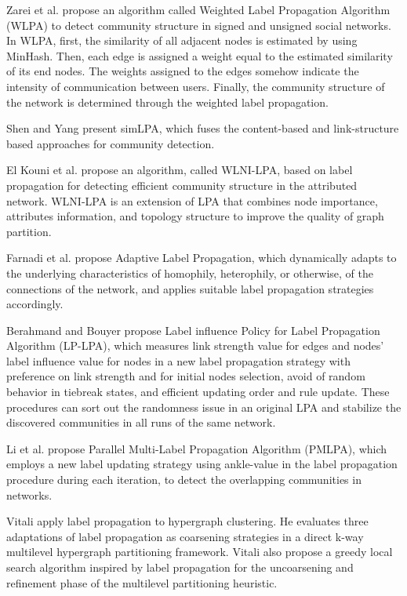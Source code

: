 {Zarei et al. \cite{zarei2020detecting} propose an algorithm called Weighted Label Propagation Algorithm (WLPA) to detect community structure in signed and unsigned social networks. In WLPA, first, the similarity of all adjacent nodes is estimated by using MinHash. Then, each edge is assigned a
weight equal to the estimated similarity of its end nodes. The weights assigned to the edges somehow indicate the intensity of communication
between users. Finally, the community structure of the network is determined through the weighted label propagation.

Shen and Yang \cite{shen2016topic} present simLPA, which fuses the content-based and link-structure based approaches for community detection.

El Kouni et al. \cite{el2021wlni} propose an algorithm, called WLNI-LPA, based on label propagation for detecting efficient community structure in the attributed network. WLNI-LPA is an extension of LPA that combines node importance, attributes information, and topology structure to improve the quality of graph partition.

Farnadi et al. \cite{farnadi2015scalable} propose Adaptive Label Propagation, which dynamically adapts to the underlying characteristics of homophily, heterophily, or otherwise, of the connections of the network, and applies suitable label propagation strategies accordingly.

Berahmand and Bouyer \cite{berahmand2018lp} propose Label influence Policy for Label Propagation Algorithm (LP-LPA), which measures link strength value for edges and nodes’ label influence value for nodes in a new label propagation strategy with preference on link strength and for initial nodes selection, avoid of random behavior in tiebreak states, and efficient updating order and rule update. These procedures can sort out the randomness issue in an original LPA and stabilize the discovered communities in all runs of the same network.

Li et al. \cite{li2015parallel} propose Parallel Multi-Label Propagation Algorithm (PMLPA), which employs a new label updating strategy using ankle-value in the label propagation procedure during each iteration, to detect the overlapping communities in networks.

Vitali \cite{henne2015label} apply label propagation to hypergraph clustering. He evaluates three adaptations of label propagation as coarsening strategies in a direct k-way multilevel hypergraph partitioning framework. Vitali also propose a greedy local search algorithm inspired by label propagation for the uncoarsening and refinement phase of the multilevel partitioning heuristic.

}
